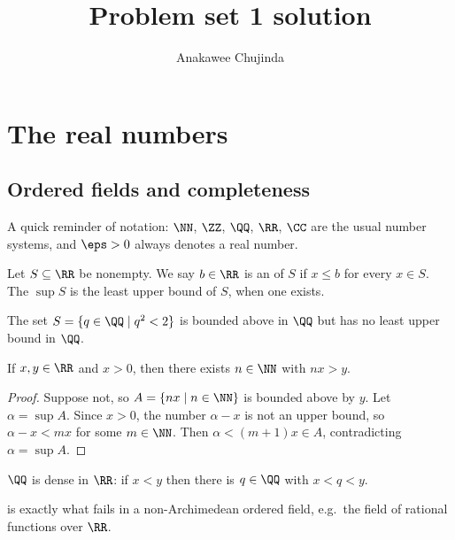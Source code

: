 \documentclass[11pt]{article}
\title{Problem set 1 solution}
\author{Anakawee Chujinda}
\begin{document}
\maketitle
\tableofcontents
\newpage

\section{The real numbers}

\subsection{Ordered fields and completeness}

A quick reminder of notation: $\NN$, $\ZZ$, $\QQ$, $\RR$, $\CC$ are the usual
number systems, and $\eps > 0$ always denotes a real number.

\begin{definition}
  Let $S \subseteq \RR$ be nonempty. We say $b \in \RR$ is an
   of $S$ if $x \le b$ for every $x \in S$.
  The  $\sup S$ is the least upper bound of $S$,
  when one exists.
\end{definition}

\begin{example}
  The set $S = \{ q \in \QQ \mid q^2 < 2 \}$ is bounded above in $\QQ$
  but has no least upper bound in $\QQ$.
\end{example}

\begin{theorem}
  \label{thm:archimedean}
  If $x, y \in \RR$ and $x > 0$, then there exists $n \in \NN$ with $nx > y$.
\end{theorem}

\begin{proof}
  Suppose not, so $A = \{ nx \mid n \in \NN \}$ is bounded above by $y$.
  Let $\alpha = \sup A$. Since $x > 0$, the number $\alpha - x$ is not an
  upper bound, so $\alpha - x < mx$ for some $m \in \NN$. Then
  $\alpha < (m+1)x \in A$, contradicting $\alpha = \sup A$.
\end{proof}

\begin{corollary}
  $\QQ$ is dense in $\RR$: if $x < y$ then there is $q \in \QQ$ with
  $x < q < y$.
\end{corollary}

\begin{remark}
   is exactly what fails in a non-Archimedean
  ordered field, e.g.\ the field of rational functions over $\RR$.
\end{remark}
\end{document}

